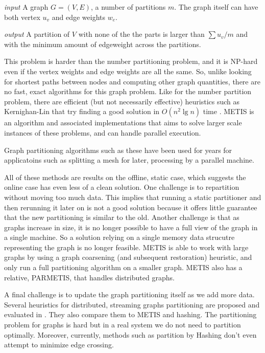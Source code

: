 \emph{input}  A graph $G = (V,E)$, a number of partitions $m$. The graph itself can have both vertex ${u_v}$ and edge weights ${w_e}$.

\emph{output} A partition of $V$ with none of the the parts is larger than  $\sum{u_v}/m$  and with the minimum amount of edgeweight across the partitions.

This problem is harder than the number partitioning problem, and it is NP-hard even if the vertex weights and edge weights are all the same. So, unlike looking for shortest paths between nodes and computing other graph quantities, there are no fast, exact algorithms for this graph problem. Like for the number partition problem, there are efficient (but not necessarily effective) heuristics such as Kernighan-Lin that try finding a good solution in $O(n^2\lg{n})$ time \cite{kernighan-lin}.  METIS \cite{metis} is an algorithm and associated implementations that aims to solve larger scale instances of these problems, and can handle parallel execution.

Graph partitioning algorithms such as these have been used for years for applicatoins such as splitting a mesh for later, processing by a parallel machine. 

All of these methods are results on the offline, static case, which suggests the online case has even less of a clean solution. One challenge is to repartition without moving too much data. This implies that running a static partitioner and then rerunning it later on is not a good solution because it offers little guarantee that the new partitioning is similar to the old. Another challenge is that as graphs increase in size, it is no longer possible to have a full view of the graph in a single machine. So a solution relying on a single memory data strucutre representing the graph is no longer feasible.  METIS is able to work with large graphs by using a graph coarsening (and subsequent restoration) heuristic, and only run a full partitioning algorithm on a smaller graph. METIS also has a relative, PARMETIS, that handles distributed graphs. 

A final challenge is to update the graph partitioning itself as we add more data.  Several heuristics for distributed, streaming graphs partitioning are proposed and evaluated  in \cite{streaming}. They also compare them to METIS  and hashing. The partitioning problem for graphs is hard but in a real system we do not need to  partition optimally. Moreover,  currently, methods such as partition by Hashing don't even attempt to minimize edge crossing.
